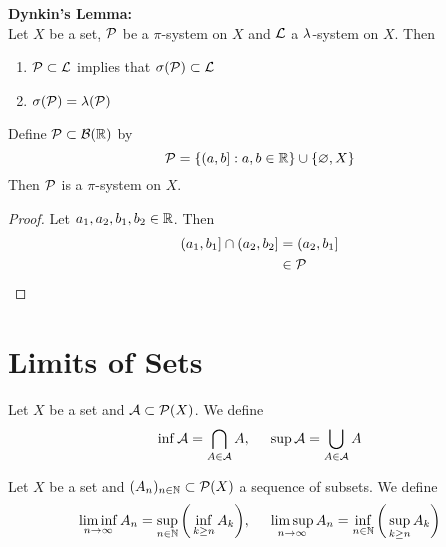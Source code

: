 \documentclass{book}
\begin{document}
	\begin{thm} \textbf{Dynkin's Lemma:} \\
		Let $X$ be a set, $\mathcal{P}$ be a $\pi$-system on $X$ and $\mathcal{L}$ a $\lambda$-system on $X$. Then
		\begin{enumerate}
			\item $\mathcal{P} \subset \mathcal{L}$ implies that $\sigma(\mathcal{P}) \subset \mathcal{L}$ 
			\item $\sigma(\mathcal{P}) = \lambda(\mathcal{P})$
		\end{enumerate} 
	\end{thm}
	
	\begin{ex}
		Define $\mathcal{P} \subset \mathcal{B}(\mathbb{R})$ by $$\mathcal{P} = \{(a,b]: a,b \in \mathbb{R}\} \cup \{\varnothing, X\}$$
		Then $\mathcal{P}$ is a $\pi$-system on $X$.
	\end{ex}

	\begin{proof}
		Let $a_1, a_2, b_1, b_2 \in \mathbb{R}$. Then 
		\begin{align*}
			(a_1, b_1] \cap (a_2, b_2] 
			& = (a_2, b_1] \\
			& \in \mathcal{P}
		\end{align*} 
	\end{proof}


	
		
	
	
	
	
	
	
	
	
	
	
	
	
	
	
	
	
	
	
	
	
	
	
	
	
	
	
	\newpage
	\section{Limits of Sets}
	
	\begin{defn}  
		Let $X$ be a set and $\mathcal{A} \subset \mathcal{P}(X)$. We define $$\inf \mathcal{A} = \bigcap_{A \in \mathcal{A} } A ,\hspace{.5cm} \sup \mathcal{A} = \bigcup_{A \in \mathcal{A}} A$$
		
	\end{defn}
	
	\begin{defn}  
		Let $X$ be a set and $(A_n)_{n \in \mathbb{N}} \subset \mathcal{P}(X)$ a sequence of subsets. We define
		$$\liminf_{n \rightarrow \infty} A_n = \sup_{n \in \mathbb{N}} \bigg( \inf_{k \geq n}A_k \bigg), \hspace{.5cm } \limsup_{n \rightarrow \infty} A_n = \inf_{n \in \mathbb{N}} \bigg(\sup_{k \geq n}A_k \bigg)$$
	\end{defn}
	
\end{document}
